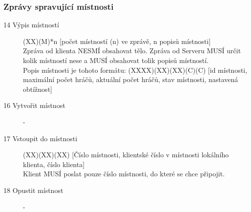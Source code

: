 \documentclass[12pt,a4paper]{article}
\begin{document}
\subsubsection*{Zprávy spravující místnosti}
\begin{description}
\item[14 Výpis místností] (XX)(M)*n [počet místností (n) ve zprávě, n popisů místnosti] \\
Zpráva od klienta NESMÍ obsahovat tělo. Zpráva od Serveru MUSÍ určit kolik místností nese a MUSÍ obsahovat tolik popisů místností. \\
Popis místnosti je tohoto formátu: (XXXX)(XX)(XX)(C)(C) [id místnosti, maximální počet hráčů, aktuální počet hráčů, stav místnosti, nastavená obtížnost]
\item[16 Vytvořit místnost] -
\item[17 Vstoupit do místnosti] (XX)(XX)(XX) [Číslo místnosti, klientské číslo v místnosti lokálního klienta, číslo klienta] \\ 
Klient MUSÍ poslat pouze číslo místnosti, do které se chce připojit.
\item[18 Opustit místnost] -
\end{description}
\end{document}
